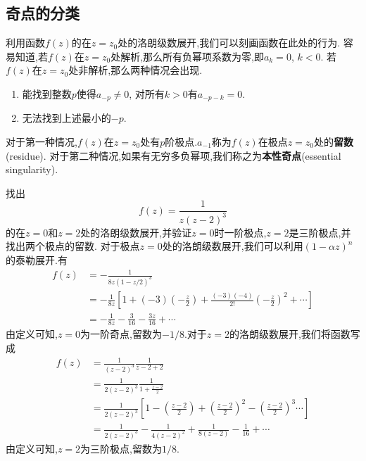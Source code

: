 \subsection{奇点的分类}
\label{subsec:singular_points}
利用函数$f(z)$的在$z=z_0$处的洛朗级数展开,我们可以刻画函数在此处的行为.
容易知道,若$f(z)$在$z=z_0$处解析,那么所有负幂项系数为零,即$a_k = 0$, $k<0$.
若$f(z)$在$z=z_0$处非解析,那么两种情况会出现.
\begin{enumerate}
    \item 能找到整数$p$使得$a_{-p} \neq 0$, 对所有$k>0$有$a_{-p - k}=0$.
    \item 无法找到上述最小的$-p$.
\end{enumerate}
对于第一种情况,$f(z)$在$z=z_0$处有$p$阶极点.$a_{-1}$称为$f(z)$在极点$z=z_0$处的\textbf{留数}(residue).
对于第二种情况,如果有无穷多负幂项,我们称之为\textbf{本性奇点}(essential singularity).

\begin{examplebox}{找出\[f(z) = \frac{1}{z( z- 2)^3}\]
    的在$z=0$和$z=2$处的洛朗级数展开,并验证$z=0$时一阶极点,$z=2$是三阶极点,并找出两个极点的留数.}
对于极点$z=0$处的洛朗级数展开,我们可以利用$(1-\alpha z)^n$的泰勒展开.有
\[
    \begin{aligned}
    f(z) &= -\frac{1}{8z(1-z/2)^3}
    \\
     &= -\frac{1}{8z}\left[ 1 + (-3) (-\frac{z}{2}) + \frac{(-3)(-4)}{2!} \left( -\frac{z}{2}\right)^2 + \cdots \right] 
    \\
     &= -\frac{1}{8z} - \frac{3}{16} - \frac{3z}{16} + \cdots   
    \end{aligned}
\]
由定义可知,$z=0$为一阶奇点,留数为$-1/8$.对于$z=2$的洛朗级数展开,我们将函数写成
\[
    \begin{aligned}
        f(z) &= \frac{1}{(z-2)^3} \frac{1}{z-2 + 2}
        \\
        &= \frac{1}{2(z-2)^3} \frac{1}{1+\frac{z-2}{2}}
        \\
        &= \frac{1}{2(z-2)^3} \left[ 1 - \left(\frac{z-2}{2} \right) + \left(\frac{z-2}{2}\right)^2 - \left(\frac{z-2}{2}\right)^3 \cdots \right] 
        \\
        &= \frac{1}{2(z-2)^3} - \frac{1}{4(z-2)^2} + \frac{1}{8(z-2)} - \frac{1}{16} + \cdots
    \end{aligned}
\]
由定义可知,$z=2$为三阶极点,留数为$1/8$.
\end{examplebox}

